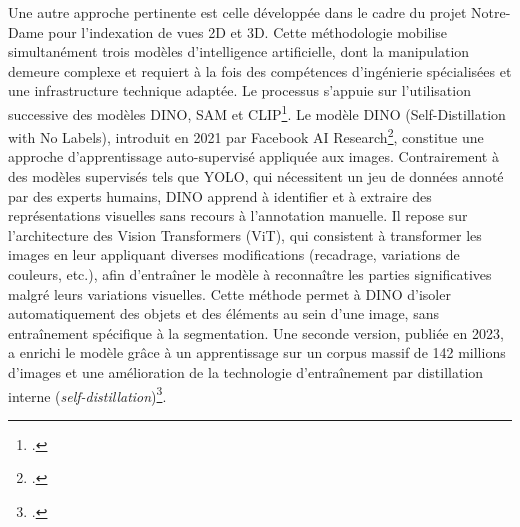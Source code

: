 Une autre approche pertinente est celle développée dans le cadre du projet Notre-Dame pour l’indexation de vues 2D et 3D. Cette méthodologie mobilise simultanément trois modèles d’intelligence artificielle, dont la manipulation demeure complexe et requiert à la fois des compétences d’ingénierie spécialisées et une infrastructure technique adaptée. Le processus s’appuie sur l’utilisation successive des modèles DINO, SAM et CLIP\footcite{delucaIntelligenceHumaineCollective2024}. Le modèle DINO (Self-Distillation with No Labels), introduit en 2021 par Facebook AI Research\footcite{caronEmergingPropertiesSelfSupervised2021}, constitue une approche d’apprentissage auto-supervisé appliquée aux images. Contrairement à des modèles supervisés tels que YOLO, qui nécessitent un jeu de données annoté par des experts humains, DINO apprend à identifier et à extraire des représentations visuelles sans recours à l’annotation manuelle. Il repose sur l’architecture des Vision Transformers (ViT), qui consistent à transformer les images en leur appliquant diverses modifications (recadrage, variations de couleurs, etc.), afin d’entraîner le modèle à reconnaître les parties significatives malgré leurs variations visuelles. Cette méthode permet à DINO d’isoler automatiquement des objets et des éléments au sein d’une image, sans entraînement spécifique à la segmentation. Une seconde version, publiée en 2023, a enrichi le modèle grâce à un apprentissage sur un corpus massif de 142 millions d’images et une amélioration de la technologie d'entraînement par distillation interne (\textit{self-distillation})\footcite{oquabDINOv2LearningRobust2023}.
